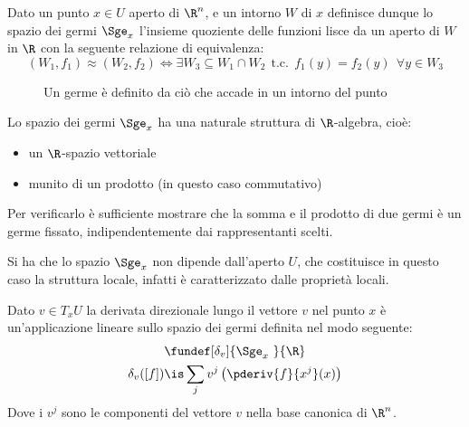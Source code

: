 \begin{defn}
Dato un punto $x\in U$ aperto di $\R ^n$, e un intorno $W$ di $x$ definisce dunque lo spazio dei germi $\Sge_x$ l'insieme quoziente delle funzioni lisce da un aperto di $W$ in $\R$ con la seguente relazione di equivalenza:
\begin{equation*}
(W_1, f_1) \approx (W_2, f_2) \iff \exists W_3 \subseteq W_1 \cap W_2\ \ \text{t.c.}\ \ f_1(y)=f_2(y)\ \ \forall y\in W_3
\end{equation*}
\end{defn}

\begin{figure}[h]
\centering

\caption{Un germe è definito da ciò che accade in un intorno del punto}
\end{figure}

Lo spazio dei germi $\Sge_x$ ha una  naturale struttura di $\R$-algebra, cioè:
\begin{itemize}
\item un $\R$-spazio vettoriale
\item munito di un prodotto (in questo caso commutativo)
\end{itemize}
Per verificarlo è sufficiente mostrare che la somma e il prodotto di due germi è un germe fissato, indipendentemente dai rappresentanti scelti.

\begin{oss}
Si ha che lo spazio $\Sge_x$ non dipende dall'aperto $U$, che costituisce in questo caso la struttura locale, infatti è caratterizzato dalle proprietà locali.
\end{oss}

\begin{defn}
Dato $v\in T_x U$ la derivata direzionale lungo il vettore $v$ nel punto $x$ è un'applicazione lineare sullo spazio dei germi definita nel modo seguente:
\begin{gather*}
\fundef[\delta_v]{\Sge_x~}{\R} \\
\delta_v([f]) \is \sum_j v^j \left(\pderiv{f}{x^j}(x)\right)
\end{gather*}
Dove i $v^j$ sono le componenti del vettore $v$ nella base canonica di $\R ^n$.
\end{defn}

